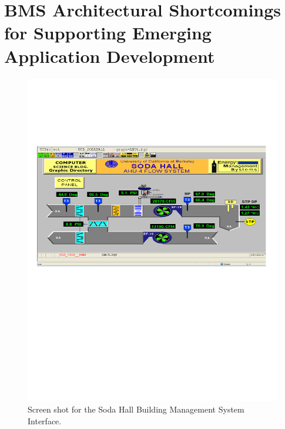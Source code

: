 \section{BMS Architectural Shortcomings for Supporting Emerging Application Development}

\begin{figure}[t!] %
\centering
\includegraphics[width=0.75\columnwidth]{figs/soda_bms_screenshot}
\caption{Screen shot for the Soda Hall Building Management System Interface.}
\label{fig:soda_bms_screenshot}
\end{figure}


